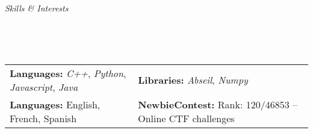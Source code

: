 \documentclass[a4paper, 12pt]{article}
\newcommand{\marginline}{-0.3cm}
\newcommand{\marginbeforesection}{0.35cm}
\newcommand{\marginbeforemisc}{-0.75cm}
\newcommand{\linewidthperso}{0.02cm}
\newcommand{\stylesection}[1]{
  \vspace{\marginbeforesection}
  \begin{normalsize}\textit{#1}\end{normalsize}
  \vspace{\marginline}\\
  \noindent\makebox[\linewidth]{\rule{\textwidth}{\linewidthperso}}

}
\begin{document}
\begin{footnotesize}
\stylesection{Skills \& Interests}
~\\
\vspace{\marginbeforemisc}

\noindent\begin{tabular}{@{}p{7.15cm}p{12cm}}
  \textbf{Languages:} \textit{C++}, \textit{Python}, \textit{Javascript}, \textit{Java} & \textbf{Libraries:} \textit{Abseil}, \textit{Numpy}\\
  \textbf{Languages:} English, French, Spanish & \textbf{NewbieContest:} Rank: 120/46853 -- Online CTF challenges\\
\end{tabular}

\end{footnotesize}
\end{document}
